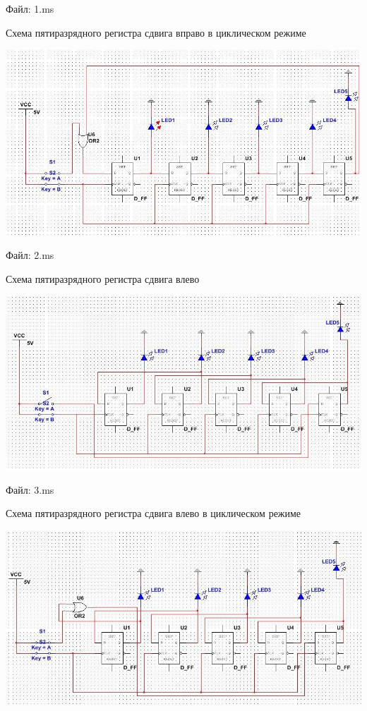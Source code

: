 \documentclass[a4paper,12pt]{article}
\begin{document}
\noindent Файл: 1.ms\newline\newline

\noindent Схема пятиразрядного регистра сдвига вправо в циклическом режиме
\begin{center}
	\includegraphics[scale=0.55]{../screens/2.jpg}
\end{center}

\noindent Файл: 2.ms\newline\newline

\clearpage
\noindent Схема пятиразрядного регистра сдвига влево
\begin{center}
	\includegraphics[scale=0.65]{../screens/3.jpg}
\end{center}

\noindent Файл: 3.ms\newline\newline

\noindent Схема пятиразрядного регистра сдвига влево в циклическом режиме
\begin{center}
	\includegraphics[scale=0.65]{../screens/4.jpg}
\end{center}
\end{document}

